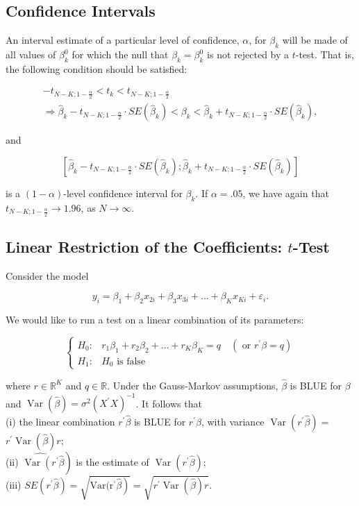 \subsection{Confidence Intervals}
An interval estimate of a particular level of confidence, $\alpha$, for $\beta_{k}$ will be made of all values of $\beta_{k}^{0}$ for which the null that $\beta_{k}=\beta_{k}^{0}$ is not rejected by a $t$-test. That is, the following condition should be satisfied:

$$
\begin{gathered}
-t_{N-K ; 1-\frac{\alpha}{2}}<t_{k}<t_{N-K ; 1-\frac{\alpha}{2}} \\
\Longrightarrow \widehat{\beta}_{k}-t_{N-K ; 1-\frac{\alpha}{2}} \cdot S E\left(\widehat{\beta}_{k}\right)<\beta_{k}<\widehat{\beta}_{k}+t_{N-K ; 1-\frac{\alpha}{2}} \cdot S E\left(\widehat{\beta}_{k}\right),
\end{gathered}
$$

and

$$
\left[\widehat{\beta}_{k}-t_{N-K ; 1-\frac{\alpha}{2}} \cdot S E\left(\widehat{\beta}_{k}\right) ; \widehat{\beta}_{k}+t_{N-K ; 1-\frac{\alpha}{2}} \cdot S E\left(\widehat{\beta}_{k}\right)\right]
$$

is a $(1-\alpha)$-level confidence interval for $\beta_{k}$. If $\alpha=.05$, we have again that $t_{N-K ; 1-\frac{\alpha}{2}} \longrightarrow 1.96$, as $N \longrightarrow \infty$.

\subsection{Linear Restriction of the Coefficients: $t$-Test}
Consider the model

$$
y_{i}=\beta_{1}+\beta_{2} x_{2 i}+\beta_{3} x_{3 i}+\ldots+\beta_{K} x_{K i}+\varepsilon_{i} .
$$

We would like to run a test on a linear combination of its parameters:

$$
\begin{cases}H_{0}: & r_{1} \beta_{1}+r_{2} \beta_{2}+\ldots+r_{K} \beta_{K}=q \quad\left(\text { or } r^{\prime} \beta=q\right) \\ H_{1}: & H_{0} \text { is false }\end{cases}
$$

where $r \in \mathbb{R}^{K}$ and $q \in \mathbb{R}$. Under the Gauss-Markov assumptions, $\widehat{\beta}$ is BLUE for $\beta$ and $\operatorname{Var}(\widehat{\beta})=\sigma^{2}\left(X^{\prime} X\right)^{-1}$. It follows that\\
(i) the linear combination $r^{\prime} \widehat{\beta}$ is BLUE for $r^{\prime} \beta$, with variance $\operatorname{Var}\left(r^{\prime} \widehat{\beta}\right)=$ $r^{\prime} \operatorname{Var}(\widehat{\beta}) r ;$\\
(ii) $\left.\widehat{\operatorname{Var}\left(r^{\prime}\right.} \widehat{\beta}\right)$ is the estimate of $\operatorname{Var}\left(r^{\prime} \widehat{\beta}\right)$;\\
(iii) $S E\left(r^{\prime} \widehat{\beta}\right)=\sqrt{\left.\operatorname{Var(r^{\prime }} \widehat{\beta}\right)}=\sqrt{r^{\prime} \operatorname{Var}(\widehat{\beta}) r}$.

